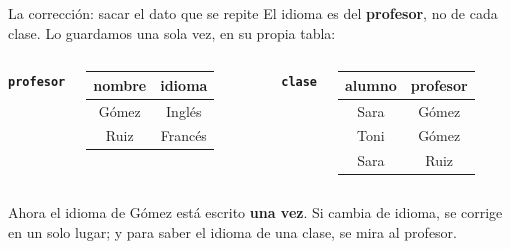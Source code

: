 \documentclass[aspectratio=169,10pt,c]{beamer}
\newcommand{\fn}[1]{\tikz[baseline=-0.5ex]{\node[rounded corners=2pt,fill=utpRojo,text=white,
  font=\bfseries\small,inner xsep=6pt,inner ysep=3pt] {#1};}}
\newcommand{\tblb}[1]{\textcolor{utpNaranja}{\textbf{\texttt{#1}}}}
\begin{document}
\begin{frame}{\fn{FNBC} La corrección: sacar el dato que se repite}
\small El idioma es del \textbf{profesor}, no de cada clase. Lo guardamos una sola vez, en su propia tabla:
\vspace{0.25cm}
\begin{columns}[T,onlytextwidth]
\centering\footnotesize\tblb{profesor}\\[3pt]
\begin{tabular}{cc}
\toprule
\bfseries nombre & \bfseries idioma \\
\midrule
Gómez & Inglés \\
Ruiz  & Francés \\
\bottomrule
\end{tabular}
\centering\footnotesize\tblb{clase}\\[3pt]
\begin{tabular}{cc}
\toprule
\bfseries alumno & \bfseries profesor \\
\midrule
Sara & Gómez \\
Toni & Gómez \\
Sara & Ruiz \\
\bottomrule
\end{tabular}
\end{columns}
\vspace{0.3cm}
\small Ahora el idioma de Gómez está escrito \textbf{una vez}. Si cambia de idioma, se corrige en un solo lugar; y para saber el idioma de una clase, se mira al profesor.
\vspace{0.15cm}
\end{frame}

\end{document}
